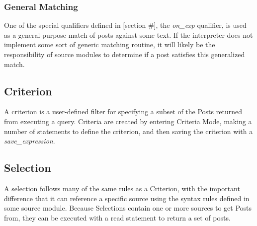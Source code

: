 \subsubsection{General Matching}%
One of the special qualifiers defined in [section #], the \emph{on_exp} qualifier, is used as a general-purpose 
match of posts against some text. If the interpreter does not implement some sort of generic matching 
routine, it will likely be the responsibility of source modules to determine if a post satisfies this 
generalized match.

\subsection{Criterion}
A criterion is a user-defined filter for specifying a subset of the Posts returned from executing a query. 
Criteria are created by entering Criteria Mode, making a number of statements to define the criterion, and 
then saving the criterion with a \emph{save_expression}.

\subsection{Selection}
A selection follows many of the same rules as a Criterion, with the important difference that it can 
reference a specific source using the syntax rules defined in some source module. Because Selections 
contain one or more sources to get Posts from, they can be executed with a read statement to return a 
set of posts.
